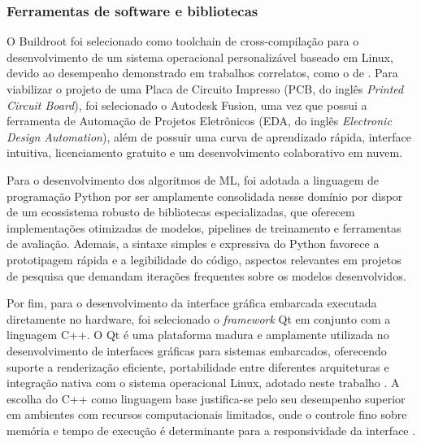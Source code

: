 \subsubsection{Ferramentas de software e bibliotecas}

O Buildroot foi selecionado como toolchain de cross-compilação para o desenvolvimento de um sistema operacional personalizável baseado em Linux, devido ao desempenho demonstrado em trabalhos correlatos, como o de . Para viabilizar o projeto de uma Placa de Circuito Impresso (PCB, do inglês \textit{Printed Circuit Board}), foi selecionado o Autodesk Fusion, uma vez que possui a ferramenta de Automação de Projetos Eletrônicos (EDA, do inglês \textit{Electronic Design Automation}), além de possuir uma curva de aprendizado rápida, interface intuitiva, licenciamento gratuito e um desenvolvimento colaborativo em nuvem.

Para o desenvolvimento dos algoritmos de ML, foi adotada a linguagem de programação Python por ser amplamente consolidada nesse domínio por dispor de um ecossistema robusto de bibliotecas especializadas, que oferecem implementações otimizadas de modelos, pipelines de treinamento e ferramentas de avaliação. Ademais, a sintaxe simples e expressiva do Python favorece a prototipagem rápida e a legibilidade do código, aspectos relevantes em projetos de pesquisa que demandam iterações frequentes sobre os modelos desenvolvidos.

Por fim, para o desenvolvimento da interface gráfica embarcada executada diretamente no hardware, foi selecionado o \textit{framework} Qt em conjunto com a linguagem C++. O Qt é uma plataforma madura e amplamente utilizada no desenvolvimento de interfaces gráficas para sistemas embarcados, oferecendo suporte a renderização eficiente, portabilidade entre diferentes arquiteturas e integração nativa com o sistema operacional Linux, adotado neste trabalho \cite{qtAbout}. A escolha do C++ como linguagem base justifica-se pelo seu desempenho superior em ambientes com recursos computacionais limitados, onde o controle fino sobre memória e tempo de execução é determinante para a responsividade da interface \cite{knuttila2012functional}.




